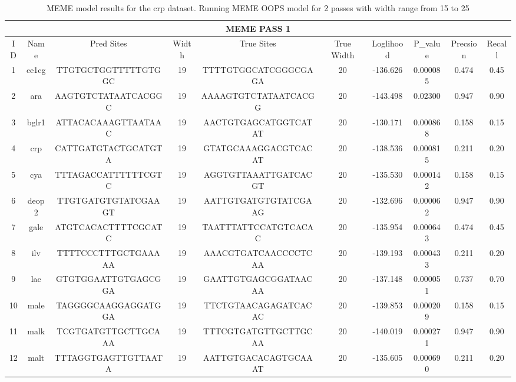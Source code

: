 \documentclass{article}
\begin{document}
\begin{table}
\setlength\tabcolsep{0.5pt} %
\footnotesize
  \caption{MEME model results for the crp dataset. Running MEME OOPS model for 2 passes with width range from 15 to 25}
  \label{sample2}
\centering
\begin{tabular}{c|c|c|c|c|c|c|c|c|c}
\multicolumn{10}{|c|}{\textbf{MEME PASS 1}}\\
   \hline
\toprule
 ID &     Name &         Pred Sites & Width &            True Sites & True Width &  Loglihood &   P\_value &  Precsion &  Recall \\
\midrule
 1 &    ce1cg &  TTGTGCTGGTTTTTGTGGC &    19 &  TTTTGTGGCATCGGGCGAGA &         20 &   -136.626 &  0.000085 &     0.474 &    0.45 \\
  2 &      ara &  AAGTGTCTATAATCACGGC &    19 &  AAAAGTGTCTATAATCACGG &         20 &   -143.498 &  0.02300 &     0.947 &    0.90 \\
  3 &    bglr1 &  ATTACACAAAGTTAATAAC &    19 &  AACTGTGAGCATGGTCATAT &         20 &   -130.171 &  0.000868 &     0.158 &    0.15 \\
  4 &      crp &  CATTGATGTACTGCATGTA &    19 &  GTATGCAAAGGACGTCACAT &         20 &   -138.536 &  0.000815 &     0.211 &    0.20 \\
  5 &      cya &  TTTAGACCATTTTTTCGTC &    19 &  AGGTGTTAAATTGATCACGT &         20 &   -135.530 &  0.000142 &     0.158 &    0.15 \\
  6 &    deop2 &  TTGTGATGTGTATCGAAGT &    19 &  AATTGTGATGTGTATCGAAG &         20 &   -132.696 &  0.000062 &     0.947 &    0.90 \\
  7 &     gale &  ATGTCACACTTTTCGCATC &    19 &  TAATTTATTCCATGTCACAC &         20 &   -135.954 &  0.000643 &     0.474 &    0.45 \\
  8 &      ilv &  TTTTCCCTTTGCTGAAAAA &    19 &  AAACGTGATCAACCCCTCAA &         20 &   -139.193 &  0.000433 &     0.211 &    0.20 \\
  9 &      lac &  GTGTGGAATTGTGAGCGGA &    19 &  GAATTGTGAGCGGATAACAA &         20 &   -137.148 &  0.000051 &     0.737 &    0.70 \\
 10 &     male &  TAGGGGCAAGGAGGATGGA &    19 &  TTCTGTAACAGAGATCACAC &         20 &   -139.853 &  0.000209 &     0.158 &    0.15 \\
 11 &     malk &  TCGTGATGTTGCTTGCAAA &    19 &  TTTCGTGATGTTGCTTGCAA &         20 &   -140.019 &  0.000271 &     0.947 &    0.90 \\
 12 &     malt &  TTTAGGTGAGTTGTTAATA &    19 &  AATTGTGACACAGTGCAAAT &         20 &   -135.605 &  0.000690 &     0.211 &    0.20 \\

\end{tabular}
\end{table}
\end{document}
